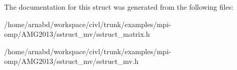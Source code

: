 The documentation for this struct was generated from the following files\+:\begin{DoxyCompactItemize}
\item 
/home/arnabd/workspace/civl/trunk/examples/mpi-\/omp/\+A\+M\+G2013/sstruct\+\_\+mv/sstruct\+\_\+matrix.\+h\item 
/home/arnabd/workspace/civl/trunk/examples/mpi-\/omp/\+A\+M\+G2013/sstruct\+\_\+mv/sstruct\+\_\+mv.\+h\end{DoxyCompactItemize}
